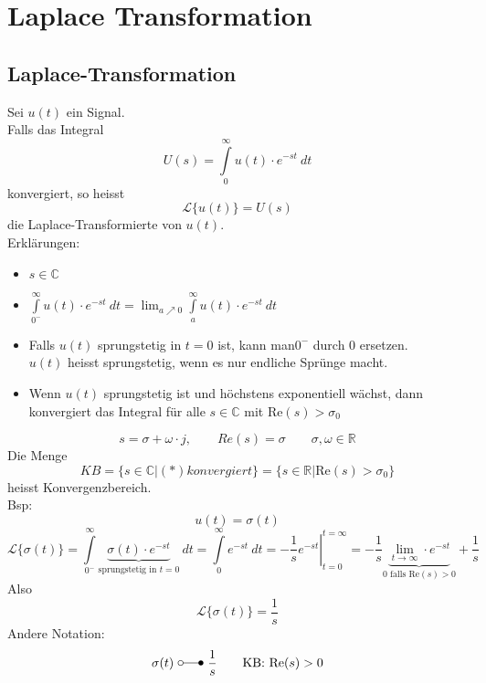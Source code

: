 



\chapter{Laplace Transformation}

\section{Laplace-Transformation}
Sei $u(t)$ ein Signal. \\
Falls das Integral 
\[ U(s) = \int\limits_{0}^{\infty} u(t) \cdot e^{-st} ~ dt \]
konvergiert, so heisst 
\[ \boxed{\mathcal{L} \lbrace u(t) \rbrace = U(s)} \]
die Laplace-Transformierte von $u(t)$. \\
Erklärungen: 
\begin{itemize}
  \item $s \in \mathbb{C}$
  \item $\int\limits_{0^-}^{\infty} u(t) \cdot e^{-st} ~ dt 
  = \lim_{a \nearrow 0} \int\limits_{a}^{\infty} u(t) \cdot e^{-st} ~ dt $
  \item Falls $u(t)$ sprungstetig in $t = 0$ ist, kann man$0^-$ durch $0$ 
        ersetzen. \\
        $u(t)$ heisst sprungstetig, wenn es nur endliche Sprünge macht. 
  \item Wenn $u(t)$ sprungstetig ist und höchstens exponentiell wächst, 
        dann konvergiert das Integral für alle $s \in \mathbb{C}$ mit 
        $\text{Re}(s) > \sigma_0$\\
\end{itemize}
\[ s = \sigma + \omega \cdot j, \qquad Re(s) = \sigma 
\qquad \sigma, \omega \in \mathbb{R} \]
Die Menge 
\[ KB = \lbrace s \in \mathbb{C} | (*) konvergiert \rbrace 
= \lbrace s \in \mathbb{R} | \text{Re}(s) > \sigma_0 \rbrace \]
heisst Konvergenzbereich. \\
Bsp: 
\[ u(t) = \sigma(t) \]
\[ \mathcal{L} \lbrace \sigma(t) \rbrace 
= \int\limits_{0^-}^{\infty} \underbrace{\sigma(t) \cdot e^{-st}}_
{\text{sprungstetig in }t = 0} ~ dt = \int\limits_{0}^{\infty} e^{-st} ~ dt 
= \left. -\frac{1}{s} e^{-st} \right|_{t = 0}^{t = \infty} 
= -\frac{1}{s} \underbrace{\lim_{t \to \infty} \cdot e^{-st}}_
{0 \text{ falls Re}(s) > 0} + \frac{1}{s} \]
Also
\[ \mathcal{L} \lbrace \sigma(t) \rbrace = \frac{1}{s} \]
Andere Notation: 
\[ \sigma(t) ~ \laplace ~ \frac{1}{s} \qquad \text{KB: Re}(s) > 0\]




